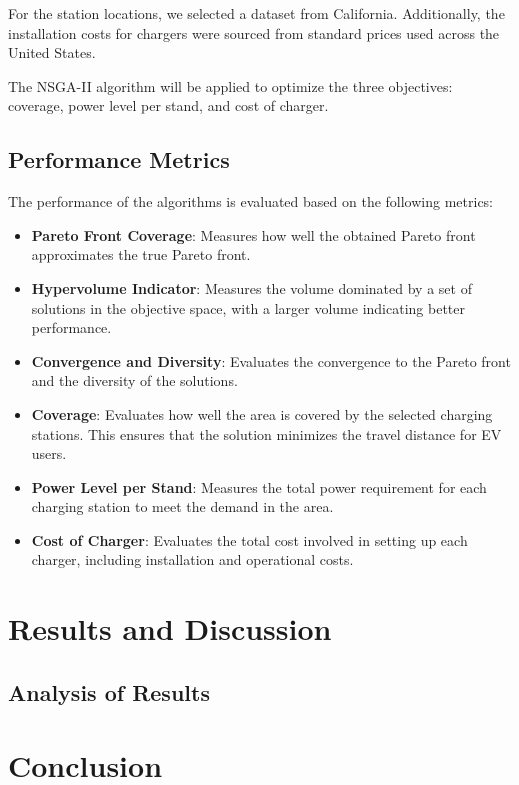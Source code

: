 \documentclass[12pt]{report}
\begin{document}
For the station locations, we selected a dataset from California. Additionally, the installation costs for chargers were sourced from standard prices used across the United States.

The NSGA-II algorithm will be applied to optimize the three objectives: coverage, power level per stand, and cost of charger.


\section{Performance Metrics}
The performance of the algorithms is evaluated based on the following metrics:
\begin{itemize}
    \item \textbf{Pareto Front Coverage}: Measures how well the obtained Pareto front approximates the true Pareto front.
    \item \textbf{Hypervolume Indicator}: Measures the volume dominated by a set of solutions in the objective space, with a larger volume indicating better performance.
    \item \textbf{Convergence and Diversity}: Evaluates the convergence to the Pareto front and the diversity of the solutions.
    \item \textbf{Coverage}: Evaluates how well the area is covered by the selected charging stations. This ensures that the solution minimizes the travel distance for EV users.
    \item \textbf{Power Level per Stand}: Measures the total power requirement for each charging station to meet the demand in the area.
    \item \textbf{Cost of Charger}: Evaluates the total cost involved in setting up each charger, including installation and operational costs.
\end{itemize}

\chapter{Results and Discussion}


\section{Analysis of Results}


\chapter{Conclusion}
\end{document}
